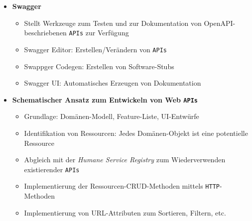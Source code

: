 \begin{itemize}
\begin{itemize}
\begin{description}
		\end{description}
	\end{itemize}
	\item \textbf{Swagger}
	\begin{itemize}
		\item Stellt Werkzeuge zum Testen und zur Dokumentation von OpenAPI-beschriebenen \texttt{APIs} zur Verfügung
		\item Swagger Editor: Erstellen/Verändern von \texttt{APIs}
		\item Swappger Codegen: Erstellen von Software-Stubs
		\item Swagger UI: Automatisches Erzeugen von Dokumentation
	\end{itemize}
	\item \textbf{Schematischer Ansatz zum Entwickeln von Web \texttt{APIs}}
	\begin{itemize}
		\item Grundlage: Domänen-Modell, Feature-Liste, UI-Entwürfe
		\item Identifikation von Ressourcen: Jedes Domänen-Objekt ist eine potentielle Ressource
		\item Abgleich mit der \textit{Humane Service Registry} zum Wiederverwenden existierender \texttt{APIs}
		\item Implementierung der Ressourcen-CRUD-Methoden mittels \texttt{HTTP}-Methoden
		\item Implementierung von URL-Attributen zum Sortieren, Filtern, etc.
	\end{itemize}
\end{itemize}


